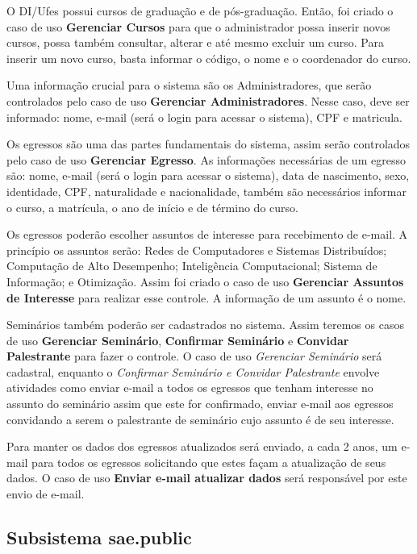 O DI/Ufes possui cursos de graduação e de pós-graduação. Então, foi criado o caso de uso \textbf{Gerenciar Cursos} para que o administrador possa inserir novos cursos, possa também consultar, alterar e até mesmo excluir um curso. Para inserir um novo curso, basta informar o código, o nome e o coordenador do curso.

Uma informação crucial para o sistema são os Administradores, que serão controlados pelo caso de uso \textbf{Gerenciar Administradores}. Nesse caso, deve ser informado: nome, e-mail (será o login para acessar o sistema), CPF e matricula.

Os egressos são uma das partes fundamentais do sistema, assim serão controlados pelo caso de uso \textbf{Gerenciar Egresso}. As informações necessárias de um egresso são: nome, e-mail (será o login para acessar o sistema), data de nascimento, sexo, identidade, CPF, naturalidade e nacionalidade, também são necessários informar o curso, a matrícula, o ano de início e de término do curso.  

Os egressos poderão escolher assuntos de interesse para recebimento de e-mail. A princípio os assuntos serão: Redes de Computadores e Sistemas Distribuídos; Computação de Alto Desempenho; Inteligência Computacional; Sistema de Informação; e Otimização. Assim foi criado o caso de uso \textbf{Gerenciar Assuntos de Interesse} para realizar esse controle. A informação de um assunto é o nome.


Seminários também poderão ser cadastrados no sistema. Assim teremos os casos de uso \textbf{Gerenciar Seminário}, \textbf{Confirmar Seminário} e \textbf{Convidar Palestrante} para fazer o controle. O caso de uso  \textit{Gerenciar Seminário} será cadastral, enquanto o  \textit{Confirmar Seminário e Convidar Palestrante} envolve atividades como enviar e-mail a todos os egressos que tenham interesse no assunto do seminário assim que este for confirmado, enviar e-mail aos egressos convidando a serem o palestrante de seminário cujo assunto é de seu interesse.

Para manter os dados dos egressos atualizados será enviado, a cada 2 anos, um e-mail para todos os egressos solicitando que estes façam a atualização de seus dados. O caso de uso \textbf{Enviar e-mail atualizar dados} será responsável por este envio de e-mail.
	
	
	






\subsection{Subsistema sae.public}
\label{sec-requisitos-casos-de-uso-public}
 

